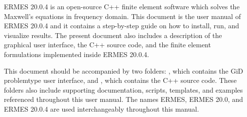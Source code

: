 %
%

ERMES 20.0.4 is an open-source C++ finite element software which solves the Maxwell's equations in frequency domain. This document is the user manual of ERMES 20.0.4 and it contains a step-by-step guide on how to install, run, and visualize results. The present document also includes a description of the graphical user interface, the C++ source code, and the finite element formulations implemented inside ERMES 20.0.4.

This document should be accompanied by two folders: , which contains the GiD problemtype user interface, and , which contains the C++ source code. These folders also include supporting documentation, scripts, templates, and examples referenced throughout this user manual. The names ERMES, ERMES 20.0, and ERMES 20.0.4 are used interchangeably throughout this manual.





